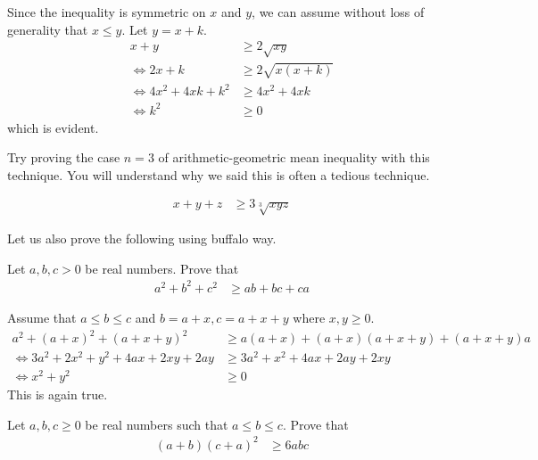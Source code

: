 \documentclass{subfile}
\begin{document}
		\begin{solution}
			Since the inequality is symmetric on $x$ and $y$, we can assume without loss of generality that $x\leq y$. Let $y=x+k$.
				\begin{align*}
					x+y
						& \geq2\sqrt{xy}\\
					\iff2x+k
						& \geq2\sqrt{x(x+k)}\\
					\iff4x^2+4xk+k^2
						& \geq4x^2+4xk\\
					\iff k^2
						& \geq0
				\end{align*}
			which is evident.
		\end{solution}
	Try proving the case $n=3$ of arithmetic-geometric mean inequality with this technique. You will understand why we said this is often a tedious technique.
		\begin{problem}
			\begin{align*}
				x+y+z
					& \geq3\sqrt[3]{xyz}
			\end{align*}
		\end{problem}
	Let us also prove the following using buffalo way.
		\begin{problem}
			Let $a,b,c>0$ be real numbers. Prove that
				\begin{align*}
					a^2+b^2+c^2
						& \geq ab+bc+ca
				\end{align*}
		\end{problem}
	
		\begin{solution}
			Assume that $a\leq b\leq c$ and $b=a+x,c=a+x+y$ where $x,y\geq0$.
				\begin{align*}
					a^2+(a+x)^2+(a+x+y)^2
						& \geq a(a+x)+(a+x)(a+x+y)+(a+x+y)a\\
					\iff 3a^2+2x^2+y^2+4ax+2xy+2ay
						& \geq 3a^2+x^2+4ax+2ay+2xy\\
					\iff x^2+y^2
						& \geq0
				\end{align*}
			This is again true.
		\end{solution}
	
		\begin{problem}
			Let $a,b,c\geq0$ be real numbers such that $a\leq b\leq c$. Prove that
				\begin{align*}
					(a+b)(c+a)^2
						& \geq6abc
				\end{align*}
		\end{problem}
	
\end{document}
